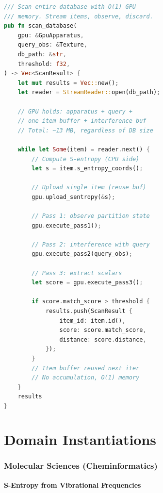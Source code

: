 \documentclass[11pt,twocolumn,a4paper]{article}
\theoremstyle{definition}
\theoremstyle{remark}
\begin{document}
\begin{lstlisting}[language=Rust,caption={Database scan with $O(1)$ GPU memory},label=lst:rust_scan]
/// Scan entire database with O(1) GPU
/// memory. Stream items, observe, discard.
pub fn scan_database(
    gpu: &GpuApparatus,
    query_obs: &Texture,
    db_path: &str,
    threshold: f32,
) -> Vec<ScanResult> {
    let mut results = Vec::new();
    let reader = StreamReader::open(db_path);

    // GPU holds: apparatus + query +
    // one item buffer + interference buf
    // Total: ~13 MB, regardless of DB size

    while let Some(item) = reader.next() {
        // Compute S-entropy (CPU side)
        let s = item.s_entropy_coords();

        // Upload single item (reuse buf)
        gpu.upload_sentropy(&s);

        // Pass 1: observe partition state
        gpu.execute_pass1();

        // Pass 2: interference with query
        gpu.execute_pass2(query_obs);

        // Pass 3: extract scalars
        let score = gpu.execute_pass3();

        if score.match_score > threshold {
            results.push(ScanResult {
                item_id: item.id(),
                score: score.match_score,
                distance: score.distance,
            });
        }
        // Item buffer reused next iter
        // No accumulation, O(1) memory
    }
    results
}
\end{lstlisting}



\part{Domain Instantiations}

\section{Molecular Sciences (Cheminformatics)}
\label{sec:molecular}

\subsection{S-Entropy from Vibrational Frequencies}
\end{document}
